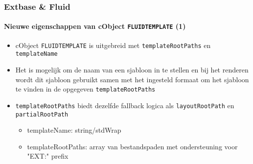 \begin{frame}[fragile]
	\frametitle{Extbase \& Fluid}
	\framesubtitle{Nieuwe eigenschappen van cObject \texttt{FLUIDTEMPLATE} (1)}

	\begin{itemize}

		\item cObject \texttt{FLUIDTEMPLATE} is uitgebreid met
			\texttt{templateRootPaths} en \texttt{templateName}

		\item Het is mogelijk om de naam van een sjabloon in te stellen en bij het renderen wordt dit sjabloon gebruikt
			samen met het ingesteld formaat om het sjabloon te vinden in de opgegeven
			\texttt{templateRootPaths}

		\item \texttt{templateRootPaths} biedt dezelfde fallback logica als
			\texttt{layoutRootPath} en \texttt{partialRootPath}

			\begin{itemize}
				\item templateName: string/stdWrap
				\item templateRootPaths: array van bestandspaden met ondersteuning voor "EXT:" prefix
			\end{itemize}

	\end{itemize}

\end{frame}


